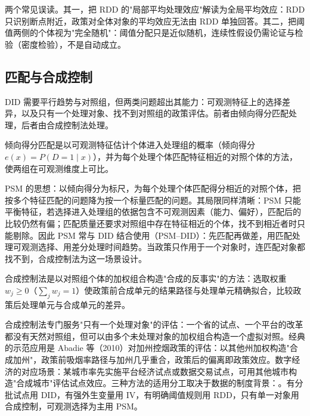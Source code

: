 \begin{misconception}
两个常见误读。其一，把 RDD 的"局部平均处理效应"解读为全局平均效应：RDD 只识别断点附近，政策对全体对象的平均效应无法由 RDD 单独回答。其二，把阈值两侧的个体视为"完全随机"：阈值分配只是近似随机，连续性假设仍需论证与检验（密度检验），不是自动成立。
\end{misconception}

\subsection{匹配与合成控制}

DID 需要平行趋势与对照组，但两类问题超出其能力：可观测特征上的选择差异，以及只有一个处理对象、找不到对照组的政策评估。前者由倾向得分匹配处理，后者由合成控制法处理。

\begin{definition}
倾向得分匹配是以可观测特征估计个体进入处理组的概率（倾向得分 $e(x) = P(D = 1 \mid x)$），并为每个处理个体匹配特征相近的对照个体的方法，使两组在可观测维度上可比。
\end{definition}

PSM 的思想：以倾向得分为标尺，为每个处理个体匹配得分相近的对照个体，把按多个特征匹配的问题降为按一个标量匹配的问题。其局限同样清晰：PSM 只能平衡特征，若选择进入处理组的依据包含不可观测因素（能力、偏好），匹配后的比较仍然有偏；匹配质量还要求对照组中存在特征相近的个体，找不到相近者时只能剔除。因此 PSM 常与 DID 结合使用（PSM--DID）：先匹配再做差，用匹配处理可观测选择、用差分处理时间趋势。当政策只作用于一个对象时，连匹配对象都找不到，合成控制法为这一场景设计。

\begin{definition}
合成控制法是以对照组个体的加权组合构造"合成的反事实"的方法：选取权重 $w_j \geq 0$（$\sum_j w_j = 1$）使政策前合成单元的结果路径与处理单元精确拟合，比较政策后处理单元与合成单元的差异。
\end{definition}

合成控制法专门服务"只有一个处理对象"的评估：一个省的试点、一个平台的改革都没有天然对照组，但可以由多个未处理对象的加权组合构造一个虚拟对照。经典的示范应用是 Abadie 等（2010）对加州控烟政策的评估：以其他州加权构造"合成加州"，政策前吸烟率路径与加州几乎重合，政策后的偏离即政策效应。数字经济的对应场景：某城市率先实施平台经济试点或数据交易试点，可用其他城市构造"合成城市"评估试点效应。三种方法的适用分工取决于数据的制度背景：。有分批试点用 DID，有强外生变量用 IV，有明确阈值规则用 RDD，只有单一对象用合成控制，可观测选择为主用 PSM。

